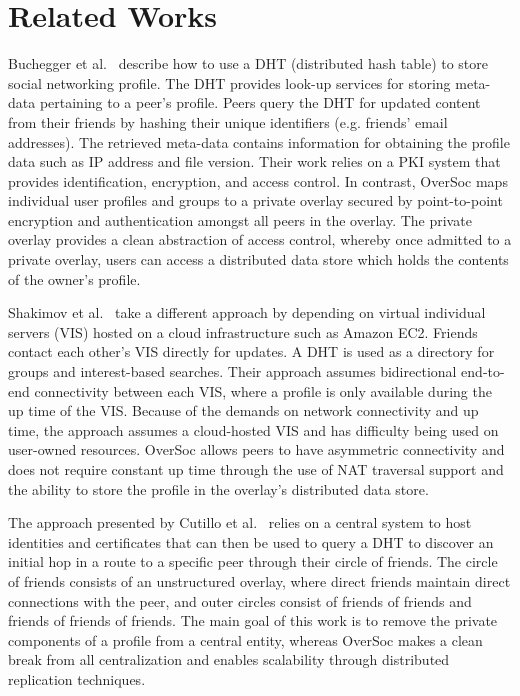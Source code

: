 \section{Related Works}
\label{vpo:background}

Buchegger et al.~\cite{peerson} describe how to use a DHT (distributed hash
table) to store social networking profile.  The DHT provides look-up services
for storing meta-data pertaining to a peer's profile.  Peers query the DHT for
updated content from their friends by hashing their unique identifiers (e.g.
friends' email addresses).  The retrieved meta-data contains information for
obtaining the profile data such as IP address and file version. Their work
relies on a PKI system that provides identification, encryption, and access
control.  In contrast, OverSoc maps individual user profiles and groups to a
private overlay secured by point-to-point encryption and authentication amongst
all peers in the overlay.  The private overlay provides a clean abstraction of
access control, whereby once admitted to a private overlay, users can access a
distributed data store which holds the contents of the owner's profile.

Shakimov et al.~\cite{vis-a-vis} take a different approach by depending on
virtual individual servers (VIS) hosted on a cloud infrastructure such as
Amazon EC2. Friends contact each other's VIS directly for updates.  A DHT is
used as a directory for groups and interest-based searches. Their approach
assumes bidirectional end-to-end connectivity between each VIS, where a profile
is only available during the up time of the VIS.  Because of the demands on
network connectivity and up time, the approach assumes a cloud-hosted VIS and
has difficulty being used on user-owned resources.  OverSoc allows peers to
have  asymmetric connectivity and does not require constant up time through the
use of NAT traversal support and the ability to store the profile in the
overlay's distributed data store.

The approach presented by Cutillo et al.~\cite{matryoshka} relies on a
central system to host identities and certificates that can then be used to
query a DHT to discover an initial hop in a route to a specific peer through
their circle of friends.  The circle of friends consists of an unstructured
overlay, where direct friends maintain direct connections with the peer, and
outer circles consist of friends of friends and friends of friends of friends.
The main goal of this work is to remove the private components of a profile
from a central entity, whereas OverSoc makes a clean break from all
centralization and enables scalability through distributed replication
techniques.


